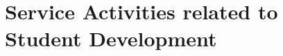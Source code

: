 \documentclass[11pt]{article}
\begin{document}









\section{Service Activities related to Student Development}
\end{document}

